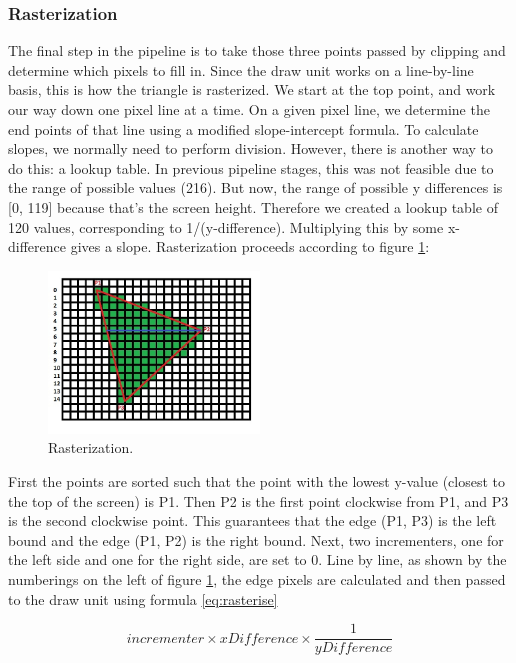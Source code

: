 \documentclass[onecolumn]{IEEEtran}
\begin{document}
\subsubsection{Rasterization}
The final step in the pipeline is to take those three points passed by clipping and determine which pixels to fill in.  Since the draw unit works on a line-by-line basis, this is how the triangle is rasterized.  We start at the top point, and work our way down one pixel line at a time.  On a given pixel line, we determine the end points of that line using a modified slope-intercept formula.  To calculate slopes, we normally need to perform division.  However, there is another way to do this: a lookup table.  In previous pipeline stages, this was not feasible due to the range of possible values (216).  But now, the range of possible y differences is [0, 119] because that's the screen height.  Therefore we created a lookup table of 120 values, corresponding to 1/(y-difference).  Multiplying this by some x-difference gives a slope.  Rasterization proceeds according to figure \ref{fig:rasteriser}:

\begin{figure}[H]
	\centering
	\includegraphics[width=0.5\textwidth]{rasteriser.png}
	\caption{Rasterization.}
	\label{fig:rasteriser}
\end{figure}

First the points are sorted such that the point with the lowest y-value (closest to the top of the screen) is P1.  Then P2 is the first point clockwise from P1, and P3 is the second clockwise point.  This guarantees that the edge (P1, P3) is the left bound and the edge (P1, P2) is the right bound.  Next, two incrementers, one for the left side and one for the right side, are set to 0.  Line by line, as shown by the numberings on the left of figure \ref{fig:rasteriser}, the edge pixels are calculated and then passed to the draw unit using formula \ref{eq:rasterise}

\begin{equation}
	\label{eq:rasterise}
	incrementer \times xDifference \times \frac{1}{yDifference}  
\end{equation}
\end{document}
